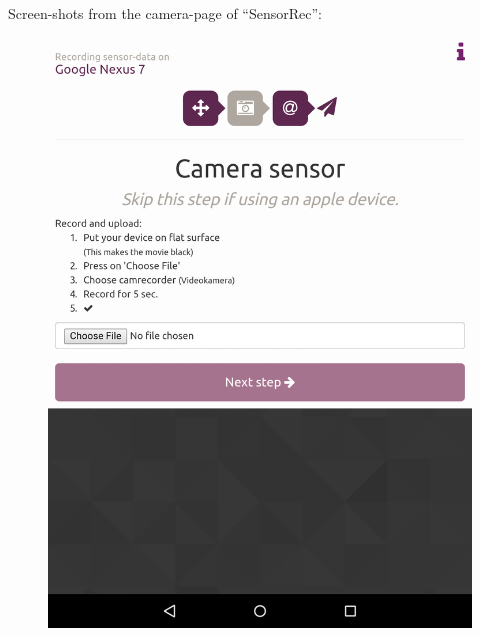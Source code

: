 Screen-shots from the camera-page of ``SensorRec'':
\begin{figure}[H]
  \hspace{-2cm}
  \centering
  \begin{minipage}[c]{.23\textwidth}
    \centering
    \includegraphics[scale=0.15]{img/sensorrec-nexus-3-cam}
  \end{minipage}
  \hspace{2cm}
  \begin{minipage}[c]{.23\textwidth}
    \centering

\end{minipage}
\end{figure}
